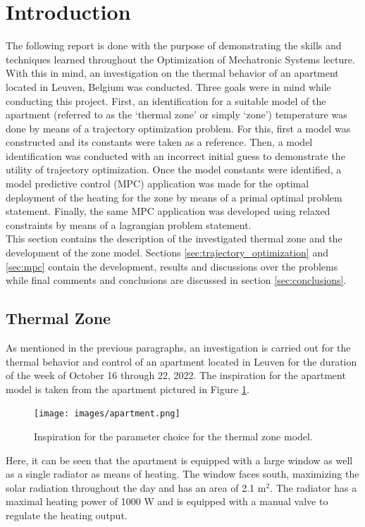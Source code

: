 \section{Introduction}
\label{sec:intro}
The following report is done with the purpose of demonstrating the skills and techniques learned throughout the Optimization of Mechatronic Systems lecture. With this in mind, an investigation on the thermal behavior of an apartment located in Leuven, Belgium was conducted. Three goals were in mind while conducting this project. First, an identification for a suitable model of the apartment (referred to as the `thermal zone' or simply `zone') temperature was done by means of a trajectory optimization problem. For this, first a model was constructed and its constants were taken as a reference. Then, a model identification was conducted with an incorrect initial guess to demonstrate the utility of trajectory optimization. Once the model constants were identified, a model predictive control (MPC) application was made for the optimal deployment of the heating for the zone by means of a primal optimal problem statement. Finally, the same MPC application was developed using relaxed constraints by means of a lagrangian problem statement. \\

This section contains the description of the investigated thermal zone and the development of the zone model. Sections \ref{sec:trajectory_optimization} and \ref{sec:mpc} contain the development, results and discussions over the problems while final comments and conclusions are discussed in section \ref{sec:conclusions}.

\subsection{Thermal Zone}
\label{subsec:thermal_zone}
As mentioned in the previous paragraphs, an investigation is carried out for the thermal behavior and control of an apartment located in Leuven for the duration of the week of October 16 through 22, 2022. The inspiration for the apartment model is taken from the apartment pictured in Figure \ref{fig:apartment}.

\begin{figure}[H]
\centering
\texttt{[image: images/apartment.png]}
\caption{Inspiration for the parameter choice for the thermal zone model.}
\label{fig:apartment}
\end{figure}

Here, it can be seen that the apartment is equipped with a large window as well as a single radiator as means of heating. The window faces south, maximizing the solar radiation throughout the day and has an area of 2.1 m$^2$. The radiator has a maximal heating power of 1000 W and is equipped with a manual valve to regulate the heating output.

